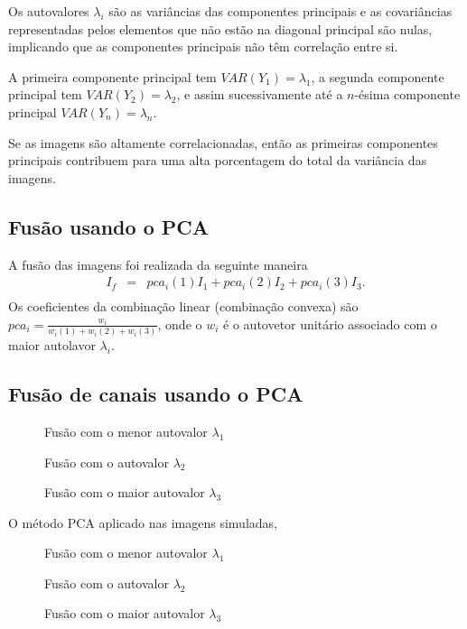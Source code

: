 Os autovalores $\lambda_i$ são as variâncias das componentes principais e as covariâncias representadas pelos elementos que não estão na diagonal principal são nulas, implicando que as componentes principais não têm correlação entre si.

A primeira componente principal tem $VAR(Y_1)=\lambda_1$, a segunda componente principal tem $VAR(Y_2)=\lambda_2$, e assim sucessivamente até a $n$-ésima componente principal $VAR(Y_n)=\lambda_n$. 

Se as imagens são altamente correlacionadas, então as primeiras componentes principais contribuem para uma alta porcentagem do total da variância das imagens.

\subsection{Fusão usando o PCA}
A fusão das imagens foi realizada da seguinte maneira 
\begin{equation*}
\begin{aligned}
	I_f&=&pca_i(1) I_1 + pca_i(2) I_2 + pca_i(3) I_3. \\
\end{aligned}
\end{equation*}
 Os coeficientes da combinação linear (combinação convexa) são $pca_i=\frac{w_i}{w_i(1)+w_i(2)+w_i(3)}$, onde o $w_i$ é o autovetor unitário associado com o maior autolavor $\lambda_i$.

\subsection{Fusão de canais usando o PCA}

\begin{figure}[!hbt]
\caption{Fusão com o menor autovalor $\lambda_1$}\label{cap_fusao_fig11}
\endminipage\hfill
{}
\caption{Fusão com o autovalor $\lambda_2$}\label{cap_fusao_fig12}
\endminipage\hfill
\centering
{}
\caption{Fusão com o maior autovalor $\lambda_3$}\label{cap_fusao_fig13}
\endminipage\hfill
\end{figure}

O método PCA aplicado nas imagens simuladas, 

\begin{figure}[!hbt]
\caption{Fusão com o menor autovalor $\lambda_1$}\label{cap_fusao_fig14}
\endminipage\hfill
{}
\caption{Fusão com o autovalor $\lambda_2$}\label{cap_fusao_fig15}
\endminipage\hfill
\centering
{}
\caption{Fusão com o maior autovalor $\lambda_3$}\label{cap_fusao_fig16}
\endminipage\hfill
\end{figure}
